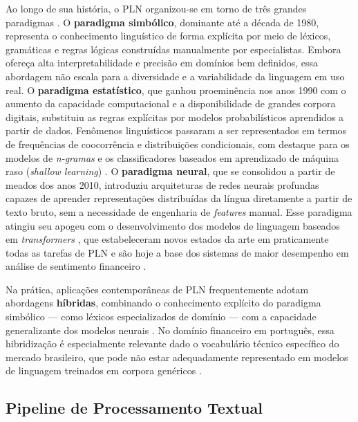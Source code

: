 Ao longo de sua história, o PLN organizou-se em torno de três grandes paradigmas \cite{caseli2024cap1}. O \textbf{paradigma simbólico}, dominante até a década de 1980, representa o conhecimento linguístico de forma explícita por meio de léxicos, gramáticas e regras lógicas construídas manualmente por especialistas. Embora ofereça alta interpretabilidade e precisão em domínios bem definidos, essa abordagem não escala para a diversidade e a variabilidade da linguagem em uso real. O \textbf{paradigma estatístico}, que ganhou proeminência nos anos 1990 com o aumento da capacidade computacional e a disponibilidade de grandes corpora digitais, substituiu as regras explícitas por modelos probabilísticos aprendidos a partir de dados. Fenômenos linguísticos passaram a ser representados em termos de frequências de coocorrência e distribuições condicionais, com destaque para os modelos de \textit{n-gramas} e os classificadores baseados em aprendizado de máquina raso (\textit{shallow learning}) \cite{jurafsky2026}. O \textbf{paradigma neural}, que se consolidou a partir de meados dos anos 2010, introduziu arquiteturas de redes neurais profundas capazes de aprender representações distribuídas da língua diretamente a partir de texto bruto, sem a necessidade de engenharia de \textit{features} manual. Esse paradigma atingiu seu apogeu com o desenvolvimento dos modelos de linguagem baseados em \textit{transformers} \cite{jurafsky2026}, que estabeleceram novos estados da arte em praticamente todas as tarefas de PLN e são hoje a base dos sistemas de maior desempenho em análise de sentimento financeiro \cite{santos2023finbert}.

Na prática, aplicações contemporâneas de PLN frequentemente adotam abordagens \textbf{híbridas}, combinando o conhecimento explícito do paradigma simbólico --- como léxicos especializados de domínio --- com a capacidade generalizante dos modelos neurais \cite{caseli2024cap1,kearney2014}. No domínio financeiro em português, essa hibridização é especialmente relevante dado o vocabulário técnico específico do mercado brasileiro, que pode não estar adequadamente representado em modelos de linguagem treinados em corpora genéricos \cite{sousa2025,santos2023finbert}.


\subsection{Pipeline de Processamento Textual}
\label{subsec:pln_pipeline}

